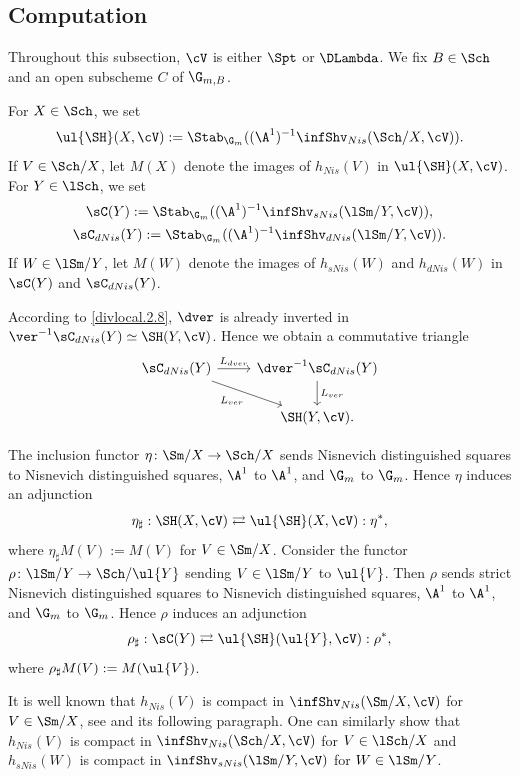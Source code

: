 \documentclass[10pt]{amsart}
\begin{document}
\subsection{Computation}

Throughout this subsection, $\cV$ is either $\Spt$ or $\DLambda$.
We fix $B\in \Sch$ and an open subscheme $C$ of $\G_{m,B}$.

For $X\in \Sch$, we set
\[
\ul{\SH}(X,\cV):=\Stab_{\G_m}((\A^1)^{-1}\infShv_{Nis}(\Sch/X,\cV)).
\]
If $V\in \Sch/X$, let $M(X)$ denote the images of $h_{Nis}(V)$ in $\ul{\SH}(X,\cV)$.
For $Y\in \lSch$, we set
\begin{gather*}
\sC(Y):=\Stab_{\G_m}((\A^1)^{-1}\infShv_{sNis}(\lSm/Y,\cV)),
\\
\sC_{dNis}(Y):=\Stab_{\G_m}((\A^1)^{-1}\infShv_{dNis}(\lSm/Y,\cV)).
\end{gather*}
If $W\in \lSm/Y$, let $M(W)$ denote the images of $h_{sNis}(W)$ and $h_{dNis}(W)$ in $\sC(Y)$ and $\sC_{dNis}(Y)$.

According to \eqref{divlocal.2.8}, $\dver$ is already inverted in $\ver^{-1}\sC_{dNis}(Y)\simeq \SH(Y,\cV)$.
Hence we obtain a commutative triangle
\begin{equation}
\begin{tikzcd}
\sC_{dNis}(Y)\ar[r,"L_{dver}"]\ar[rd,"L_{ver}"']
&
\dver^{-1}\sC_{dNis}(Y)\ar[d,"L_{ver}"]
\\
&
\SH(Y,\cV).
\end{tikzcd}
\end{equation}

The inclusion functor $\eta\colon \Sm/X\to \Sch/X$ sends Nisnevich distinguished squares to Nisnevich distinguished squares, $\A^1$ to $\A^1$, and $\G_m$ to $\G_m$.
Hence $\eta$ induces an adjunction
\begin{equation}
\eta_\sharp :
\SH(X,\cV) \rightleftarrows \ul{\SH}(X,\cV)
: \eta^*,
\end{equation}
where $\eta_\sharp M(V):=M(V)$ for $V\in \Sm/X$.
Consider the functor $\rho\colon \lSm/Y\to \Sch/\ul{Y}$ sending $V\in \lSm/Y$ to $\ul{V}$.
Then $\rho$ sends strict Nisnevich distinguished squares to Nisnevich distinguished squares, $\A^1$ to $\A^1$, and $\G_m$ to $\G_m$.
Hence $\rho$ induces an adjunction
\begin{equation}
\rho_\sharp :
\sC(Y)\rightleftarrows \ul{\SH}(\ul{Y},\cV)
: \rho^*,
\end{equation}
where $\rho_\sharp M(V):=M(\ul{V})$.



It is well known that $h_{Nis}(V)$ is compact in $\infShv_{Nis}(\Sm/X,\cV)$ for $V\in \Sm/X$, see \cite[Proposition 4.5.62]{Ayo07} and its following paragraph.
One can similarly show that $h_{Nis}(V)$ is compact in $\infShv_{Nis}(\Sch/X,\cV)$ for $V\in \lSch/X$ and $h_{sNis}(W)$ is compact in $\infShv_{sNis}(\lSm/Y,\cV)$ for $W\in \lSm/Y$.
\end{document}
